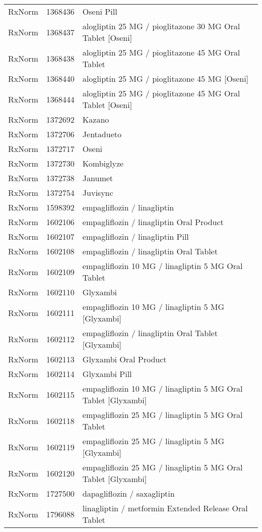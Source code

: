 \begin{longtable}{p{}p{}p{}}
  RxNorm & 1368436 & Oseni Pill \\ 
  RxNorm & 1368437 & alogliptin 25 MG / pioglitazone 30 MG Oral Tablet [Oseni] \\ 
  RxNorm & 1368438 & alogliptin 25 MG / pioglitazone 45 MG Oral Tablet \\ 
  RxNorm & 1368440 & alogliptin 25 MG / pioglitazone 45 MG [Oseni] \\ 
  RxNorm & 1368444 & alogliptin 25 MG / pioglitazone 45 MG Oral Tablet [Oseni] \\ 
  RxNorm & 1372692 & Kazano \\ 
  RxNorm & 1372706 & Jentadueto \\ 
  RxNorm & 1372717 & Oseni \\ 
  RxNorm & 1372730 & Kombiglyze \\ 
  RxNorm & 1372738 & Janumet \\ 
  RxNorm & 1372754 & Juvisync \\ 
  RxNorm & 1598392 & empagliflozin / linagliptin \\ 
  RxNorm & 1602106 & empagliflozin / linagliptin Oral Product \\ 
  RxNorm & 1602107 & empagliflozin / linagliptin Pill \\ 
  RxNorm & 1602108 & empagliflozin / linagliptin Oral Tablet \\ 
  RxNorm & 1602109 & empagliflozin 10 MG / linagliptin 5 MG Oral Tablet \\ 
  RxNorm & 1602110 & Glyxambi \\ 
  RxNorm & 1602111 & empagliflozin 10 MG / linagliptin 5 MG [Glyxambi] \\ 
  RxNorm & 1602112 & empagliflozin / linagliptin Oral Tablet [Glyxambi] \\ 
  RxNorm & 1602113 & Glyxambi Oral Product \\ 
  RxNorm & 1602114 & Glyxambi Pill \\ 
  RxNorm & 1602115 & empagliflozin 10 MG / linagliptin 5 MG Oral Tablet [Glyxambi] \\ 
  RxNorm & 1602118 & empagliflozin 25 MG / linagliptin 5 MG Oral Tablet \\ 
  RxNorm & 1602119 & empagliflozin 25 MG / linagliptin 5 MG [Glyxambi] \\ 
  RxNorm & 1602120 & empagliflozin 25 MG / linagliptin 5 MG Oral Tablet [Glyxambi] \\ 
  RxNorm & 1727500 & dapagliflozin / saxagliptin \\ 
  RxNorm & 1796088 & linagliptin / metformin Extended Release Oral Tablet \\ 

\end{longtable}
